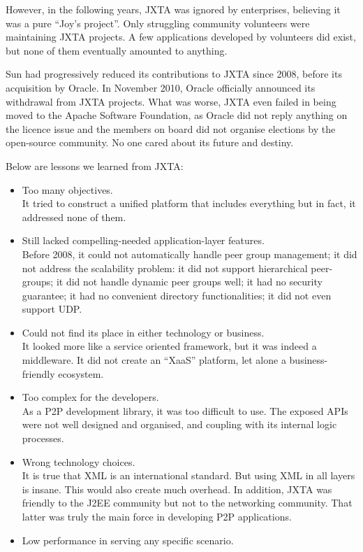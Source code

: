 However, in the following years, JXTA was ignored by enterprises, believing it was a pure ``Joy's project''.  Only struggling community volunteers were maintaining JXTA projects. A few applications developed by volunteers did exist, but none of them eventually amounted to anything. 

Sun had progressively reduced its contributions to JXTA since 2008, before its acquisition by Oracle. In November 2010, Oracle officially announced its withdrawal from JXTA projects. What was worse, JXTA even failed in being moved to the Apache Software Foundation, as Oracle did not reply anything on the licence issue and the members on board did not organise elections by the open-source community. No one cared about its future and destiny. 

Below are lessons we learned from JXTA: 
\begin{itemize}
	\item Too many objectives.\\
	It tried to construct a unified platform that includes everything but in fact, it addressed none of them. 
	\item Still lacked compelling-needed application-layer features.\\
	Before 2008, it could not automatically handle peer group management; it did not address the scalability problem: it did not support hierarchical peer-groups; it did not handle dynamic peer groups well; it had no security guarantee; it had no convenient directory functionalities; it did not even support UDP. 
	\item Could not find its place in either technology or business.\\
	It looked more like a service oriented framework, but it was indeed a middleware. It did not create an ``XaaS'' platform, let alone a business-friendly ecosystem. 
	\item Too complex for the developers.\\
	As a P2P development library, it was too difficult to use. The exposed APIs were not well designed and organised, and coupling with its internal logic processes. 
	\item Wrong technology choices.\\
	It is true that XML is an international standard. But using XML in all layers is insane. This would also create much overhead. In addition, JXTA was friendly to the J2EE community but not to the networking community. That latter was truly the main force in developing P2P applications.   
	\item Low performance in serving any specific scenario.\\

\end{itemize}
